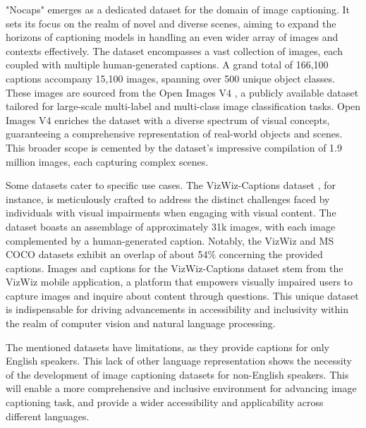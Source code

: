 \documentclass[runningheads]{llncs}
\begin{document}
"Nocaps" \cite{Nocaps} emerges as a dedicated dataset for the domain of image captioning. It sets its focus on the realm of novel and diverse scenes, aiming to expand the horizons of captioning models in handling an even wider array of images and contexts effectively. The dataset encompasses a vast collection of images, each coupled with multiple human-generated captions. A grand total of 166,100 captions accompany 15,100 images, spanning over 500 unique object classes. These images are sourced from the Open Images V4 \cite{Openimages}, a publicly available dataset tailored for large-scale multi-label and multi-class image classification tasks. Open Images V4 enriches the dataset with a diverse spectrum of visual concepts, guaranteeing a comprehensive representation of real-world objects and scenes. This broader scope is cemented by the dataset's impressive compilation of 1.9 million images, each capturing complex scenes.

Some datasets cater to specific use cases. The VizWiz-Captions dataset \cite{VizWiz}, for instance, is meticulously crafted to address the distinct challenges faced by individuals with visual impairments when engaging with visual content. The dataset boasts an assemblage of approximately 31k images, with each image complemented by a human-generated caption. Notably, the VizWiz and MS COCO datasets exhibit an overlap of about 54\% concerning the provided captions. Images and captions for the VizWiz-Captions dataset stem from the VizWiz mobile application, a platform that empowers visually impaired users to capture images and inquire about content through questions. This unique dataset is indispensable for driving advancements in accessibility and inclusivity within the realm of computer vision and natural language processing.

The mentioned datasets have limitations, as they provide captions for only English speakers. This lack of other language representation shows the necessity of the development of image captioning datasets for non-English speakers. This will enable a more comprehensive and inclusive environment for advancing image captioning task, and provide a wider accessibility and applicability across different languages.
\end{document}
